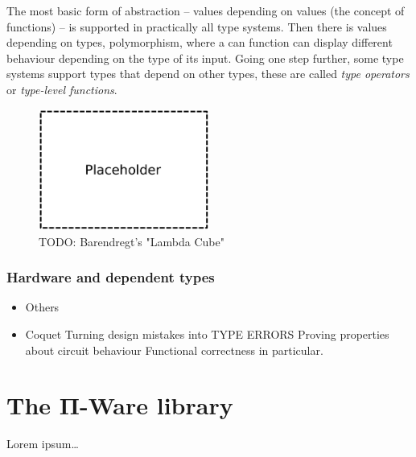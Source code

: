 \documentclass[a4paper,draft]{report}
\begin{document}
                The most basic form of abstraction -- values depending on values (the concept of functions) -- is
                supported in practically all type systems.
                Then there is values depending on types, polymorphism, where a can function can display different
                behaviour depending on the type of its input.
                Going one step further, some type systems support types that depend on other types, these are
                called \emph{type operators} or \emph{type-level functions}.

                \begin{figure}[h]
                    \centerline{\includegraphics[width=0.5\textwidth]{imgs/lambda-cube.pdf}}
                    \caption{TODO: Barendregt's "Lambda Cube" \label{fig:lambda-cube}}
                \end{figure}

            \subsection{Hardware and dependent types}
            \label{sec:hardware-dtp}
                \begin{itemize}
                    \item Others
                    \item Coquet
                        \subitem Turning design mistakes into TYPE ERRORS
                        \subitem Proving properties about circuit behaviour
                        \subsubitem Functional correctness in particular.
                \end{itemize}


    \chapter{The Π-Ware library}
    \label{chap:piware}
        Lorem ipsum\ldots

\end{document}
